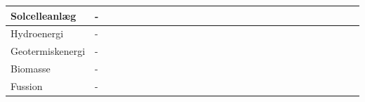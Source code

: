 \documentclass[a4paper,12pt]{report}
\begin{document}
\begin{table}[H]
\begin{tabular}{|p{0.2\linewidth}|p{0.8\linewidth}|}
Solcelleanlæg        & -                                                                                                                                                                                                                                                                                                                                                                                                                                                                                                                                                                            \\ \hline
Hydroenergi          & -                                                                                                                                                                                                                                                                                                                                                                                                                                                                                                                                                                            \\ \hline
Geotermiskenergi     & -                                                                                                                                                                                                                                                                                                                                                                                                                                                                                                                                                                            \\ \hline
Biomasse             & -                                                                                                                                                                                                                                                                                                                                                                                                                                                                                                                                                                            \\ \hline
Fussion              & -                                                                                                                                                                                                                                                                                                                                                                                                                                                                                                                                                                            \\ \hline

\end{tabular}
\end{table}
\end{document}
